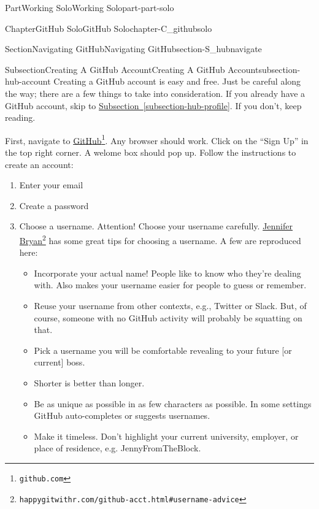 \documentclass[oneside,10pt,]{book}
\newcommand{\xreffont}{\relax}
\begin{document}
\begin{partptx}{Part}{Working Solo}{}{Working Solo}{}{}{part-part-solo}
\begin{chapterptx}{Chapter}{GitHub Solo}{}{GitHub Solo}{}{}{chapter-C_githubsolo}
\begin{sectionptx}{Section}{Navigating GitHub}{}{Navigating GitHub}{}{}{section-S_hubnavigate}
\begin{introduction}{}
\end{introduction}%
%
%
\typeout{************************************************}
\typeout{************************************************}
%
\begin{subsectionptx}{Subsection}{Creating A GitHub Account}{}{Creating A GitHub Account}{}{}{subsection-hub-account}
%
%
Creating a GitHub account is easy and free. Just be careful along the way; there are a few things to take into consideration. If you already have a GitHub account, skip to \hyperref[subsection-hub-profile]{Subsection~{\xreffont\ref{subsection-hub-profile}}}. If you don't, keep reading.%
\par
First, navigate to \href{https://github.com}{GitHub}\footnote{\nolinkurl{github.com}\label{fn-hub-account-e-b}}. Any browser should work. Click on the ``Sign Up'' in the top right corner. A welome box should pop up. Follow the instructions to create an account:%
\begin{enumerate}
\item{}Enter your email%
\item{}Create a password%
\item{}Choose a username. Attention! Choose your username carefully. \href{https://happygitwithr.com/github-acct.html\#username-advice}{Jennifer Bryan}\footnote{\nolinkurl{happygitwithr.com/github-acct.html\#username-advice}\label{fn-hub-account-e-d-c-a-b}} has some great tips for choosing a username. A few are reproduced here:%
\begin{itemize}[label=\textbullet]
\item{}Incorporate your actual name! People like to know who they're dealing with. Also makes your username easier for people to guess or remember.%
\item{}Reuse your username from other contexts, e.g., Twitter or Slack. But, of course, someone with no GitHub activity will probably be squatting on that.%
\item{}Pick a username you will be comfortable revealing to your future [or current] boss.%
\item{}Shorter is better than longer.%
\item{}Be as unique as possible in as few characters as possible. In some settings GitHub auto-completes or suggests usernames.%
\item{}Make it timeless. Don't highlight your current university, employer, or place of residence, e.g. JennyFromTheBlock.%

\end{itemize}
\end{enumerate}
\end{subsectionptx}
\end{sectionptx}
\end{chapterptx}
\end{partptx}
\end{document}
